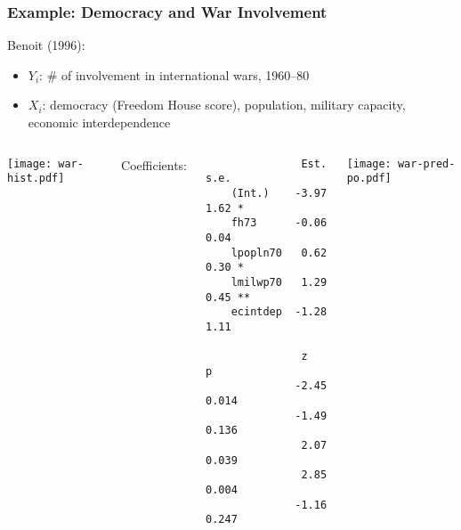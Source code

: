 \documentclass{beamer}
\begin{document}
\begin{frame}[fragile]
\frametitle{Example: Democracy and War Involvement}
Benoit (1996):
\begin{itemize}
 \item $Y_i$: \# of involvement in international wars, 1960--80
 \item $X_i$: democracy (Freedom House score), population, military capacity, economic interdependence
\end{itemize}
\pause
\vspace{-1.75\baselineskip}
\begin{columns}
\begin{center}
\texttt{[image: war-hist.pdf]}
\end{center}
\pause
{}
{\scriptsize
\quad \qquad Coefficients:
\begin{verbatim}
               Est. s.e.
    (Int.)    -3.97 1.62 *
    fh73      -0.06 0.04
    lpopln70   0.62 0.30 *
    lmilwp70   1.29 0.45 **
    ecintdep  -1.28 1.11

               z    p
              -2.45 0.014
              -1.49 0.136
               2.07 0.039
               2.85 0.004
              -1.16 0.247
\end{verbatim}
}
\pause
{}
\begin{center}
\texttt{[image: war-pred-po.pdf]}
\end{center}

\end{columns}

\end{frame}
\end{document}
